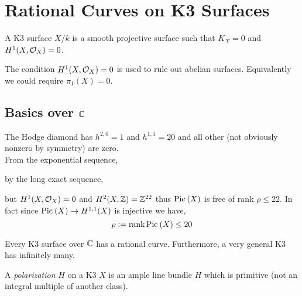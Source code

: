 \documentclass[12pt]{article}
\begin{document}
\section{Rational Curves on K3 Surfaces}

\begin{defn}
A K3 surface $X / k$ is a smooth projective surface such that $K_X = 0$ and $H^1(X, \mathcal{O}_{X}) = 0$.
\end{defn}

\begin{rmk}
The condition $H^1(X, \mathcal{O}_{X}) = 0$ is used to rule out abelian surfaces. Equivalently we could require $\pi_1(X) = 0$.
\end{rmk}

\subsection{Basics over $\mathbb{C}$}

The Hodge diamond has $h^{2,0} = 1$ and $h^{1,1} = 20$ and all other (not obviously nonzero by symmetry) are zero.
\bigskip\\
From the exponential sequence,
\begin{center}
\end{center}
by the long exact sequence,
\begin{center}
\end{center}
but $H^1(X, \mathcal{O}_{X}) = 0$ and $H^2(X, \mathbb{Z}) = \mathbb{Z}^{22}$ thus $\mathrm{Pic}^{} \left( X \right)$ is free of rank $\rho \le 22$. In fact since $\mathrm{Pic}^{} \left( X \right) \to H^{1,1}(X)$ is injective we have,
\[ \rho := \operatorname{\mathrm{rank}}{\mathrm{Pic}^{} \left( X \right)} \le 20 \]

\begin{theorem}
Every K3 surface over $\mathbb{C}$ has a rational curve. Furthermore, a very general K3 has infinitely many. 
\end{theorem}

\begin{defn}
A \textit{polarization} $H$ on a K3 $X$ is an ample line bundle $H$ which is primitive (not an integral multiple of another class). 
\end{defn}
\end{document}
